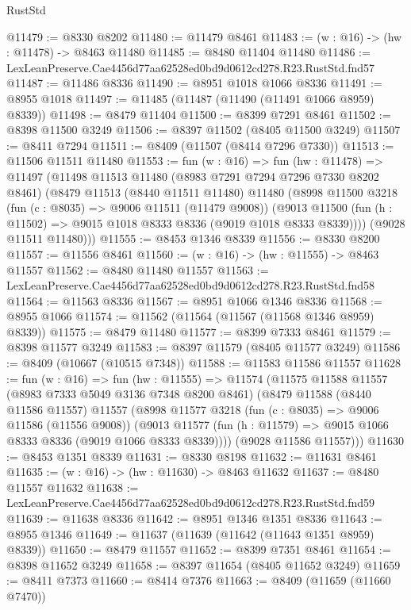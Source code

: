 \begin{lexlean}{RustStd}
\begin{coremodule}
@11479 := @8330 @8202
@11480 := @11479 @8461
@11483 := (w : @16) -> (hw : @11478) -> @8463 @11480
@11485 := @8480 @11404 @11480
@11486 := LexLeanPreserve.Cae4456d77aa62528ed0bd9d0612cd278.R23.RustStd.fnd57
@11487 := @11486 @8336
@11490 := @8951 @1018 @1066 @8336
@11491 := @8955 @1018
@11497 := @11485 (@11487 (@11490 (@11491 @1066 @8959) @8339))
@11498 := @8479 @11404
@11500 := @8399 @7291 @8461
@11502 := @8398 @11500 @3249
@11506 := @8397 @11502 (@8405 @11500 @3249)
@11507 := @8411 @7294
@11511 := @8409 (@11507 (@8414 @7296 @7330))
@11513 := @11506 @11511 @11480
@11553 := fun (w : @16) =>
  fun (hw : @11478) =>
  @11497
    (@11498
      @11513
      @11480
      (@8983 @7291 @7294 @7296 @7330 @8202 @8461)
      (@8479
        @11513
        (@8440 @11511 @11480)
        @11480
        (@8998
          @11500
          @3218
          (fun (c : @8035) => @9006 @11511 (@11479 @9008))
          (@9013 @11500 (fun (h : @11502) => @9015 @1018 @8333 @8336 (@9019 @1018 @8333 @8339))))
        (@9028 @11511 @11480)))
@11555 := @8453 @1346 @8339
@11556 := @8330 @8200
@11557 := @11556 @8461
@11560 := (w : @16) -> (hw : @11555) -> @8463 @11557
@11562 := @8480 @11480 @11557
@11563 := LexLeanPreserve.Cae4456d77aa62528ed0bd9d0612cd278.R23.RustStd.fnd58
@11564 := @11563 @8336
@11567 := @8951 @1066 @1346 @8336
@11568 := @8955 @1066
@11574 := @11562 (@11564 (@11567 (@11568 @1346 @8959) @8339))
@11575 := @8479 @11480
@11577 := @8399 @7333 @8461
@11579 := @8398 @11577 @3249
@11583 := @8397 @11579 (@8405 @11577 @3249)
@11586 := @8409 (@10667 (@10515 @7348))
@11588 := @11583 @11586 @11557
@11628 := fun (w : @16) =>
  fun (hw : @11555) =>
  @11574
    (@11575
      @11588
      @11557
      (@8983 @7333 @5049 @3136 @7348 @8200 @8461)
      (@8479
        @11588
        (@8440 @11586 @11557)
        @11557
        (@8998
          @11577
          @3218
          (fun (c : @8035) => @9006 @11586 (@11556 @9008))
          (@9013 @11577 (fun (h : @11579) => @9015 @1066 @8333 @8336 (@9019 @1066 @8333 @8339))))
        (@9028 @11586 @11557)))
@11630 := @8453 @1351 @8339
@11631 := @8330 @8198
@11632 := @11631 @8461
@11635 := (w : @16) -> (hw : @11630) -> @8463 @11632
@11637 := @8480 @11557 @11632
@11638 := LexLeanPreserve.Cae4456d77aa62528ed0bd9d0612cd278.R23.RustStd.fnd59
@11639 := @11638 @8336
@11642 := @8951 @1346 @1351 @8336
@11643 := @8955 @1346
@11649 := @11637 (@11639 (@11642 (@11643 @1351 @8959) @8339))
@11650 := @8479 @11557
@11652 := @8399 @7351 @8461
@11654 := @8398 @11652 @3249
@11658 := @8397 @11654 (@8405 @11652 @3249)
@11659 := @8411 @7373
@11660 := @8414 @7376
@11663 := @8409 (@11659 (@11660 @7470))

\end{coremodule}
\end{lexlean}
